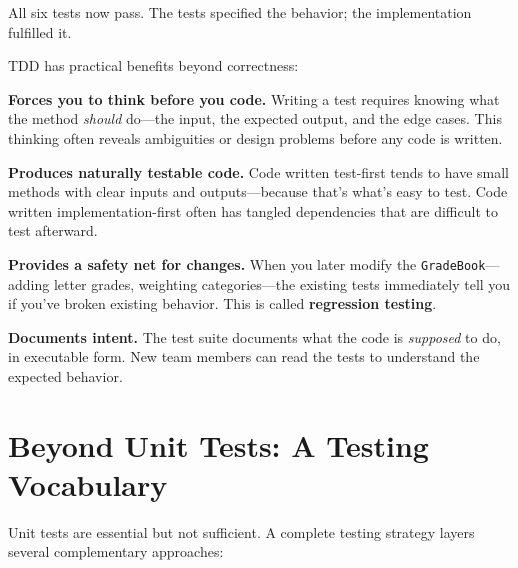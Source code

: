 \documentclass[11pt,letterpaper]{article}
\newcommand{\keyterm}[1]{\textbf{\textcolor{cssecondary}{#1}}}
\begin{document}
All six tests now pass. The tests specified the behavior; the implementation fulfilled it.

\begin{tipbox}
TDD has practical benefits beyond correctness:

\textbf{Forces you to think before you code.} Writing a test requires knowing what the method \textit{should} do---the input, the expected output, and the edge cases. This thinking often reveals ambiguities or design problems before any code is written.

\textbf{Produces naturally testable code.} Code written test-first tends to have small methods with clear inputs and outputs---because that's what's easy to test. Code written implementation-first often has tangled dependencies that are difficult to test afterward.

\textbf{Provides a safety net for changes.} When you later modify the \texttt{GradeBook}---adding letter grades, weighting categories---the existing tests immediately tell you if you've broken existing behavior. This is called \keyterm{regression testing}.

\textbf{Documents intent.} The test suite documents what the code is \textit{supposed} to do, in executable form. New team members can read the tests to understand the expected behavior.
\end{tipbox}

\section{Beyond Unit Tests: A Testing Vocabulary}

Unit tests are essential but not sufficient. A complete testing strategy layers several complementary approaches:

\begin{center}
\end{center}
\end{document}
